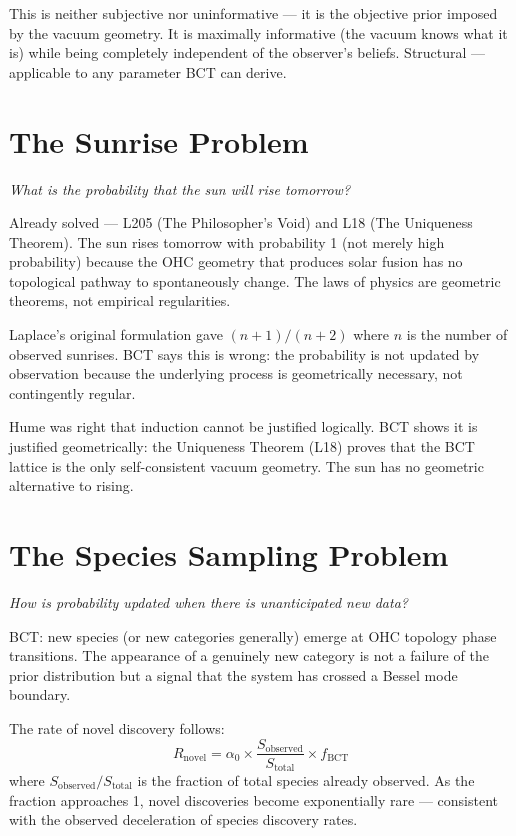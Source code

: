 \documentclass[aps,prl,twocolumn,superscriptaddress]{revtex4-2}
\begin{document}
This is neither subjective nor uninformative --- it is the objective prior imposed by the vacuum geometry. It is maximally informative (the vacuum knows what it is) while being completely independent of the observer's beliefs. Structural --- applicable to any parameter BCT can derive.

\section{The Sunrise Problem}

\emph{What is the probability that the sun will rise tomorrow?}

Already solved --- L205 (The Philosopher's Void) and L18 (The Uniqueness Theorem). The sun rises tomorrow with probability 1 (not merely high probability) because the OHC geometry that produces solar fusion has no topological pathway to spontaneously change. The laws of physics are geometric theorems, not empirical regularities.

Laplace's original formulation gave $(n+1)/(n+2)$ where $n$ is the number of observed sunrises. BCT says this is wrong: the probability is not updated by observation because the underlying process is geometrically necessary, not contingently regular.

Hume was right that induction cannot be justified logically. BCT shows it is justified geometrically: the Uniqueness Theorem (L18) proves that the BCT lattice is the only self-consistent vacuum geometry. The sun has no geometric alternative to rising.

\section{The Species Sampling Problem}

\emph{How is probability updated when there is unanticipated new data?}

BCT: new species (or new categories generally) emerge at OHC topology phase transitions. The appearance of a genuinely new category is not a failure of the prior distribution but a signal that the system has crossed a Bessel mode boundary.

The rate of novel discovery follows:
\begin{equation}
R_{\mathrm{novel}} = \alpha_0 \times \frac{S_{\mathrm{observed}}}{S_{\mathrm{total}}} \times f_{\mathrm{BCT}}
\end{equation}
where $S_{\mathrm{observed}}/S_{\mathrm{total}}$ is the fraction of total species already observed. As the fraction approaches 1, novel discoveries become exponentially rare --- consistent with the observed deceleration of species discovery rates.
\end{document}
